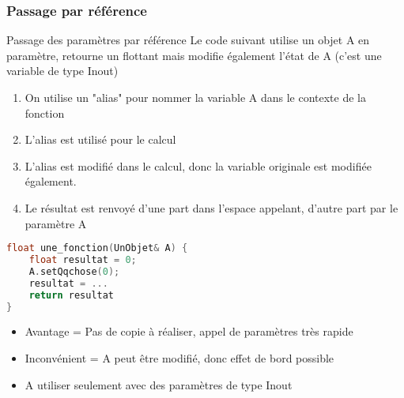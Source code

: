 \documentclass{beamer}
\begin{document}
\begin{frame}[fragile=singleslide,shrink=20]
\frametitle {Passage par référence}

\begin{block}{Passage des paramètres par référence}
Le code suivant utilise un objet A en paramètre, retourne un flottant mais modifie également l'état de A (c'est une variable de type Inout)
\begin{enumerate}
\item On utilise un "alias" pour nommer la variable A dans le contexte de la fonction
\item L'alias est utilisé pour le calcul
\item L'alias est modifié dans le calcul, donc la variable originale est modifiée également.
\item Le résultat est renvoyé d'une part dans l'espace appelant, d'autre part par le paramètre A
\end{enumerate}
\end{block}

\begin{lstlisting}[language=c++]
float une_fonction(UnObjet& A) {
    float resultat = 0;
    A.setQqchose(0);
    resultat = ...
    return resultat
}
\end{lstlisting}

\begin{block}{}
\begin{itemize}
\item Avantage = Pas de copie à réaliser, appel de paramètres très rapide
\item Inconvénient = A peut être modifié, donc effet de bord possible
\item A utiliser seulement avec des paramètres de type Inout
\end{itemize}
\end{block}
\end{frame}
\end{document}
